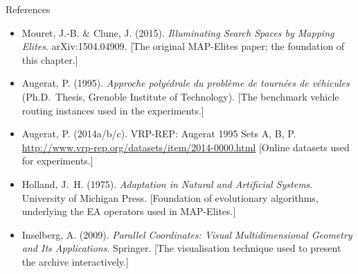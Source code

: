 \documentclass[aspectratio=169,10pt]{beamer}
\begin{document}
\begin{frame}{References}
\begin{itemize}
  \item Mouret, J.-B. \& Clune, J. (2015).
        \emph{Illuminating Search Spaces by Mapping Elites}.
        arXiv:1504.04909.
        [The original MAP-Elites paper; the foundation of this chapter.]

  \item Augerat, P. (1995).
        \emph{Approche poly\'{e}drale du probl\`{e}me de tourn\'{e}es de
        v\'{e}hicules} (Ph.D.\ Thesis, Grenoble Institute of Technology).
        [The benchmark vehicle routing instances used in the experiments.]

  \item Augerat, P. (2014a/b/c).
        VRP-REP: Augerat 1995 Sets A, B, P.
        \url{http://www.vrp-rep.org/datasets/item/2014-0000.html}
        [Online datasets used for experiments.]

  \item Holland, J.\ H. (1975).
        \emph{Adaptation in Natural and Artificial Systems}.
        University of Michigan Press.
        [Foundation of evolutionary algorithms, underlying the EA
        operators used in MAP-Elites.]

  \item Inselberg, A. (2009).
        \emph{Parallel Coordinates: Visual Multidimensional Geometry
        and Its Applications}.
        Springer.
        [The visualisation technique used to present the archive
        interactively.]
\end{itemize}
\end{frame}
\end{document}
